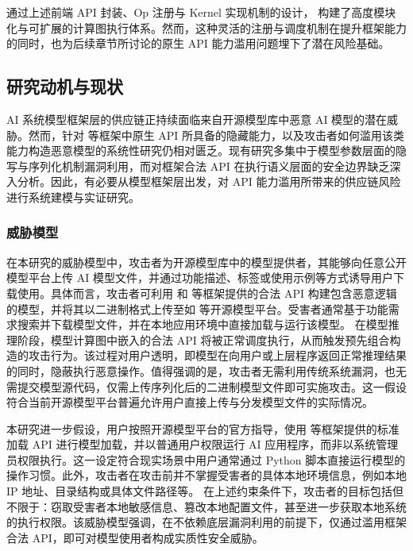 通过上述前端 API 封装、Op 注册与 Kernel 实现机制的设计， 构建了高度模块化与可扩展的计算图执行体系。然而，这种灵活的注册与调度机制在提升框架能力的同时，也为后续章节所讨论的原生 API 能力滥用问题埋下了潜在风险基础。

\subsection{研究动机与现状}
AI 系统模型框架层的供应链正持续面临来自开源模型库中恶意 AI 模型的潜在威胁。然而，针对  等框架中原生 API 所具备的隐藏能力，以及攻击者如何滥用该类能力构造恶意模型的系统性研究仍相对匮乏。现有研究多集中于模型参数层面的隐写与序列化机制漏洞利用，而对框架合法 API 在执行语义层面的安全边界缺乏深入分析。因此，有必要从模型框架层出发，对 API 能力滥用所带来的供应链风险进行系统建模与实证研究。
\subsubsection{威胁模型}
在本研究的威胁模型中，攻击者为开源模型库中的模型提供者，其能够向任意公开模型平台上传 AI 模型文件，并通过功能描述、标签或使用示例等方式诱导用户下载使用。具体而言，攻击者可利用  和  等框架提供的合法 API 构建包含恶意逻辑的模型，并将其以二进制格式上传至如  等开源模型平台。受害者通常基于功能需求搜索并下载模型文件，并在本地应用环境中直接加载与运行该模型。
在模型推理阶段，模型计算图中嵌入的合法 API 将被正常调度执行，从而触发预先组合构造的攻击行为。该过程对用户透明，即模型在向用户或上层程序返回正常推理结果的同时，隐蔽执行恶意操作。值得强调的是，攻击者无需利用传统系统漏洞，也无需提交模型源代码，仅需上传序列化后的二进制模型文件即可实施攻击。这一假设符合当前开源模型平台普遍允许用户直接上传与分发模型文件的实际情况。

本研究进一步假设，用户按照开源模型平台的官方指导，使用  等框架提供的标准加载 API 进行模型加载，并以普通用户权限运行 AI 应用程序，而非以系统管理员权限执行。这一设定符合现实场景中用户通常通过 Python 脚本直接运行模型的操作习惯。此外，攻击者在攻击前并不掌握受害者的具体本地环境信息，例如本地 IP 地址、目录结构或具体文件路径等。
在上述约束条件下，攻击者的目标包括但不限于：窃取受害者本地敏感信息、篡改本地配置文件，甚至进一步获取本地系统的执行权限。该威胁模型强调，在不依赖底层漏洞利用的前提下，仅通过滥用框架合法 API，即可对模型使用者构成实质性安全威胁。

